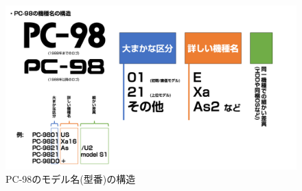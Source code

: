 \documentclass[b5paper,9pt,platex,dvipdfmx]{jsarticle}
\begin{document}
\begin{figure}[H]
  \centering
  \includegraphics[width=15cm]{img-2.png}
  \caption{PC-98のモデル名(型番)の構造}
\end{figure}
\end{document}
